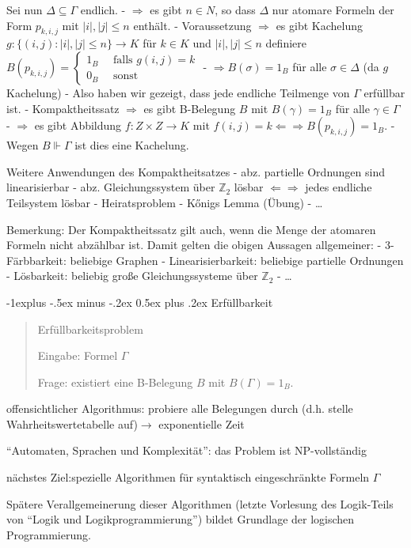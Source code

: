 \documentclass[a4paper]{article}
\makeatletter
\renewcommand{\subsection}{\@startsection{subsection}{2}{0mm}%
                {-1explus -.5ex minus -.2ex}%
                {0.5ex plus .2ex}%
                {\normalfont\normalsize\bfseries}}
\makeatother
\begin{document}
\begin{multicols}{3}
  Sei nun $\Delta\subseteq\Gamma$ endlich. - $\Rightarrow$ es gibt
  $n\in N$, so dass $\Delta$ nur atomare Formeln der Form $p_{k,i,j}$ mit
  $|i|,|j|\leq n$ enthält. - Voraussetzung $\Rightarrow$ es gibt Kachelung
  $g:\{(i,j) :|i|,|j| \leq n\}\rightarrow K$ für $k\in K$ und
  $|i|,|j|\leq n$ definiere
  $B(p_{k,i,j}) = \begin{cases} 1_B \quad\text{ falls } g(i,j) =k \\ 0_B \quad\text{ sonst} \end{cases}$
  - $\Rightarrow B(\sigma) = 1_B$ für alle $\sigma\in\Delta$ (da $g$
  Kachelung) - Also haben wir gezeigt, dass jede endliche Teilmenge von
  $\Gamma$ erfüllbar ist. - Kompaktheitssatz $\Rightarrow$ es gibt
  B-Belegung $B$ mit $B(\gamma) = 1_B$ für alle $\gamma\in\Gamma$ -
  $\Rightarrow$ es gibt Abbildung $f:Z\times Z\rightarrow K$ mit
  $f(i,j) =k \Leftarrow\Rightarrow B(p_{k,i,j}) = 1_B$. - Wegen
  $B\Vdash\Gamma$ ist dies eine Kachelung.

  Weitere Anwendungen des Kompaktheitsatzes - abz. partielle Ordnungen
  sind linearisierbar - abz. Gleichungssystem über $\mathbb{Z}_2$ lösbar
  $\Leftarrow\Rightarrow$ jedes endliche Teilsystem lösbar -
  Heiratsproblem - Kőnigs Lemma (Übung) - \ldots{}

  Bemerkung: Der Kompaktheitssatz gilt auch, wenn die Menge der atomaren
  Formeln nicht abzählbar ist. Damit gelten die obigen Aussagen
  allgemeiner: - 3-Färbbarkeit: beliebige Graphen - Linearisierbarkeit:
  beliebige partielle Ordnungen - Lösbarkeit: beliebig große
  Gleichungssysteme über $\mathbb{Z}_2$ - \ldots{}

  \subsection{Erfüllbarkeit}\label{erfuxfcllbarkeit}

  \begin{quote}
    Erfüllbarkeitsproblem

    Eingabe: Formel $\Gamma$

    Frage: existiert eine B-Belegung $B$ mit $B(\Gamma) = 1_B$.
  \end{quote}

  \begin{itemize*}
    \itemsep1pt\parskip0pt
    \item
          offensichtlicher Algorithmus: probiere alle Belegungen durch (d.h.
          stelle Wahrheitswertetabelle auf)$\rightarrow$ exponentielle Zeit
    \item
          ``Automaten, Sprachen und Komplexität'': das Problem ist
          NP-vollständig
    \item
          nächstes Ziel:spezielle Algorithmen für syntaktisch eingeschränkte
          Formeln $\Gamma$
    \item
          Spätere Verallgemeinerung dieser Algorithmen (letzte Vorlesung des
          Logik-Teils von ``Logik und Logikprogrammierung'') bildet Grundlage
          der logischen Programmierung.
  \end{itemize*}


\end{multicols}
\end{document}
